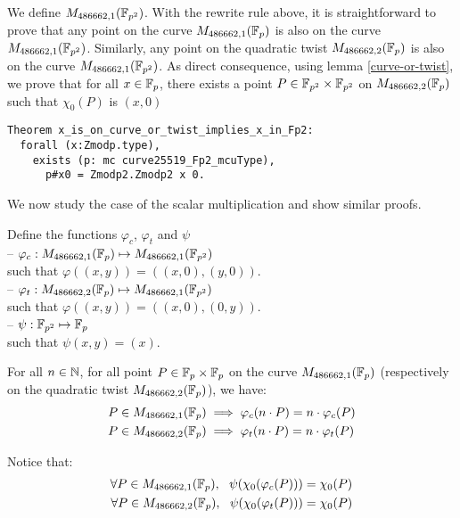 We define $M_{486662,1}(\mathbb{F}_{p^2})$. With the rewrite rule above, it is straightforward to prove that any point on the curve $M_{486662,1}(\mathbb{F}_{p})$ is also on the curve $M_{486662,1}(\mathbb{F}_{p^2})$. Similarly, any point on the quadratic twist $M_{486662,2}(\mathbb{F}_{p})$ is also on the curve $M_{486662,1}(\mathbb{F}_{p^2})$.
As direct consequence, using lemma \ref{curve-or-twist}, we prove that for all $x \in \mathbb{F}_{p}$, there exists a point $P \in \mathbb{F}_{p^2}\times\mathbb{F}_{p^2}$ on $M_{486662,2}(\mathbb{F}_{p})$ such that $\chi_0(P)$ is $(x,0)$

\begin{lstlisting}[language=Coq]
Theorem x_is_on_curve_or_twist_implies_x_in_Fp2:
  forall (x:Zmodp.type),
    exists (p: mc curve25519_Fp2_mcuType),
      p#x0 = Zmodp2.Zmodp2 x 0.
\end{lstlisting}

We now study the case of the scalar multiplication and show similar proofs.
\begin{definition}
Define the functions $\varphi_c$, $\varphi_t$ and $\psi$\\
-- $\varphi_c: M_{486662,1}(\mathbb{F}_{p}) \mapsto M_{486662,1}(\mathbb{F}_{p^2})$\\
  such that $\varphi((x,y)) = ((x,0), (y,0))$.\\
-- $\varphi_t: M_{486662,2}(\mathbb{F}_{p}) \mapsto M_{486662,1}(\mathbb{F}_{p^2})$\\
  such that $\varphi((x,y)) = ((x,0), (0,y))$.\\
-- $\psi: \mathbb{F}_{p^2} \mapsto \mathbb{F}_{p}$\\
  such that $\psi(x,y) = (x)$.
\end{definition}

\begin{lemma}
For all $n \in \mathbb{N}$, for all point $P\in\mathbb{F}_{p}\times\mathbb{F}_{p}$ on the curve $M_{486662,1}(\mathbb{F}_{p})$ (respectively on the quadratic twist $M_{486662,2}(\mathbb{F}_{p})$), we have:
\begin{align*}
P \in M_{486662,1}(\mathbb{F}_{p}) &\implies \varphi_c(n \cdot P) = n \cdot \varphi_c(P)\\
P \in M_{486662,2}(\mathbb{F}_{p}) &\implies \varphi_t(n \cdot P) = n \cdot \varphi_t(P)
\end{align*}
\end{lemma}

Notice that:
\begin{align*}
\forall P \in M_{486662,1}(\mathbb{F}_{p}),\ \ \psi(\chi_0(\varphi_c(P))) = \chi_0(P)\\
\forall P \in M_{486662,2}(\mathbb{F}_{p}),\ \ \psi(\chi_0(\varphi_t(P))) = \chi_0(P)
\end{align*}

